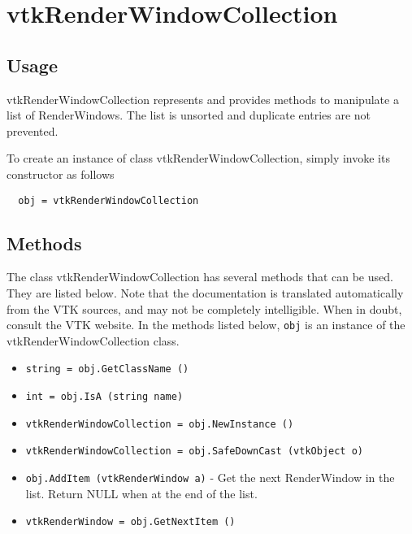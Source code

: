 \section{vtkRenderWindowCollection}

\subsection{Usage}

 vtkRenderWindowCollection represents and provides methods to manipulate a 
 list of RenderWindows. The list is unsorted and duplicate entries are 
 not prevented.

To create an instance of class vtkRenderWindowCollection, simply
invoke its constructor as follows
\begin{verbatim}
  obj = vtkRenderWindowCollection
\end{verbatim}
\subsection{Methods}

The class vtkRenderWindowCollection has several methods that can be used.
  They are listed below.
Note that the documentation is translated automatically from the VTK sources,
and may not be completely intelligible.  When in doubt, consult the VTK website.
In the methods listed below, \verb|obj| is an instance of the vtkRenderWindowCollection class.
\begin{itemize}
\item  \verb|string = obj.GetClassName ()|

\item  \verb|int = obj.IsA (string name)|

\item  \verb|vtkRenderWindowCollection = obj.NewInstance ()|

\item  \verb|vtkRenderWindowCollection = obj.SafeDownCast (vtkObject o)|

\item  \verb|obj.AddItem (vtkRenderWindow a)| -  Get the next RenderWindow in the list. Return NULL when at the end of the 
 list.

\item  \verb|vtkRenderWindow = obj.GetNextItem ()|

\end{itemize}
